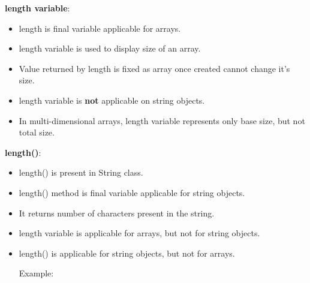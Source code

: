 \setlength{\columnsep}{3pt}
\begin{flushleft}
	
	\textbf{length variable}:
	\begin{itemize}
		\item length is final variable applicable for arrays.
		\item length variable is used to display size of an array.
		\item Value returned by length is fixed as array once created cannot change it's size.
		\bigskip
		\bigskip
		
		\item length variable is \textbf{not} applicable on string objects.
		\bigskip
		
		\item In multi-dimensional arrays, length variable represents only base size, but not total size.
		\bigskip
		
	\end{itemize}
	
	\textbf{length()}:
	\begin{itemize}
		\item length() is present in String class.
		\item length() method is final variable applicable for string objects.
		\item It returns number of characters present in the string.
		\bigskip
		\bigskip
		\bigskip
		
		\item length variable is applicable for arrays, but not for string objects.
		\item length() is applicable for string objects, but not for arrays.
		
		
		Example:
		\bigskip	
		

\end{itemize}
\end{flushleft}
